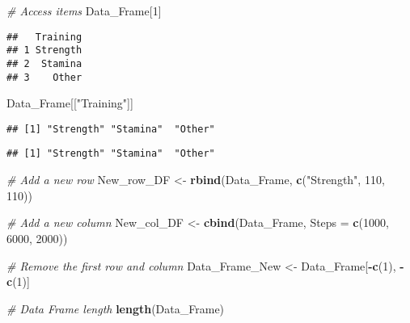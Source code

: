 \documentclass[
]{article}
\newenvironment{Shaded}{\begin{snugshade}}{\end{snugshade}}
\newcommand{\AttributeTok}[1]{\textcolor[rgb]{0.13,0.29,0.53}{#1}}
\newcommand{\CommentTok}[1]{\textcolor[rgb]{0.56,0.35,0.01}{\textit{#1}}}
\newcommand{\DecValTok}[1]{\textcolor[rgb]{0.00,0.00,0.81}{#1}}
\newcommand{\FunctionTok}[1]{\textcolor[rgb]{0.13,0.29,0.53}{\textbf{#1}}}
\newcommand{\NormalTok}[1]{#1}
\newcommand{\OtherTok}[1]{\textcolor[rgb]{0.56,0.35,0.01}{#1}}
\newcommand{\SpecialCharTok}[1]{\textcolor[rgb]{0.81,0.36,0.00}{\textbf{#1}}}
\newcommand{\StringTok}[1]{\textcolor[rgb]{0.31,0.60,0.02}{#1}}
\begin{document}
\begin{Shaded}
\begin{Highlighting}[]
\CommentTok{\# Access items}
\NormalTok{Data\_Frame[}\DecValTok{1}\NormalTok{]}
\end{Highlighting}
\end{Shaded}

\begin{verbatim}
##   Training
## 1 Strength
## 2  Stamina
## 3    Other
\end{verbatim}

\begin{Shaded}
\begin{Highlighting}[]
\NormalTok{Data\_Frame[[}\StringTok{"Training"}\NormalTok{]]}
\end{Highlighting}
\end{Shaded}

\begin{verbatim}
## [1] "Strength" "Stamina"  "Other"
\end{verbatim}

\begin{Shaded}
\end{Shaded}

\begin{verbatim}
## [1] "Strength" "Stamina"  "Other"
\end{verbatim}

\begin{Shaded}
\begin{Highlighting}[]
\CommentTok{\# Add a new row}
\NormalTok{New\_row\_DF }\OtherTok{\textless{}{-}} \FunctionTok{rbind}\NormalTok{(Data\_Frame, }\FunctionTok{c}\NormalTok{(}\StringTok{"Strength"}\NormalTok{, }\DecValTok{110}\NormalTok{, }\DecValTok{110}\NormalTok{))}

\CommentTok{\# Add a new column}
\NormalTok{New\_col\_DF }\OtherTok{\textless{}{-}} \FunctionTok{cbind}\NormalTok{(Data\_Frame, }\AttributeTok{Steps =} \FunctionTok{c}\NormalTok{(}\DecValTok{1000}\NormalTok{, }\DecValTok{6000}\NormalTok{, }\DecValTok{2000}\NormalTok{))}

\CommentTok{\# Remove the first row and column}
\NormalTok{Data\_Frame\_New }\OtherTok{\textless{}{-}}\NormalTok{ Data\_Frame[}\SpecialCharTok{{-}}\FunctionTok{c}\NormalTok{(}\DecValTok{1}\NormalTok{), }\SpecialCharTok{{-}}\FunctionTok{c}\NormalTok{(}\DecValTok{1}\NormalTok{)]}

\CommentTok{\# Data Frame length}
\FunctionTok{length}\NormalTok{(Data\_Frame)}
\end{Highlighting}
\end{Shaded}
\end{document}
